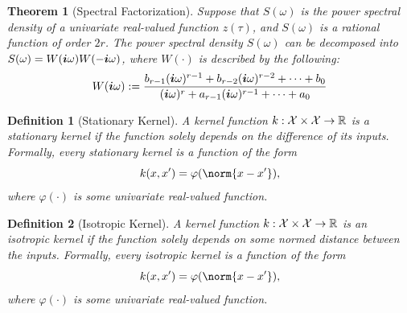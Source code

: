 \documentclass[10pt]{article}
\newtheorem{theorem}{Theorem}[section]
\newtheorem{definition}{Definition}[section]
\numberwithin{equation}{section}
\begin{document}
\begin{theorem}[Spectral Factorization]
\label{thm:spectral-factor}
    Suppose that $S(\omega)$ is the power spectral density of a univariate real-valued function $z(\tau)$, and $S(\omega)$ is a rational function of order $2r$. The power spectral density $S(\omega)$ can be decomposed into $S(\omega) = W(\bm{i}\omega)W(-\bm{i}\omega)$, where $W(\cdot)$ is described by the following:
    \begin{equation}
    \label{eq:spectral-factor}
        W(\bm{i}\omega) := \frac{b_{r-1}(\bm{i}\omega)^{r-1} + b_{r-2}(\bm{i}\omega)^{r-2} + \cdots + b_{0}}{(\bm{i}\omega)^{r} + a_{r-1}(\bm{i}\omega)^{r-1} + \cdots + a_{0}}
    \end{equation}
\end{theorem}

\begin{definition}[Stationary Kernel]
\label{def:stationary-kernel}
    A kernel function $k: \mathcal{X} \times \mathcal{X} \to \mathbb{R}$ is a stationary kernel if the function solely depends on the difference of its inputs. Formally, every stationary kernel is a function of the form
    \begin{equation}
        k(x, x') = \varphi(\norm{x - x'}),
    \end{equation}
    where $\varphi(\cdot)$ is some univariate real-valued function.
\end{definition}

\begin{definition}[Isotropic Kernel]
\label{def:isotropic-kernel}
    A kernel function $k: \mathcal{X} \times \mathcal{X} \to \mathbb{R}$ is an isotropic kernel if the function solely depends on some normed distance between the inputs. Formally, every isotropic kernel is a function of the form
    \begin{equation}
        k(x, x') = \varphi(\norm{x - x'}),
    \end{equation}
    where $\varphi(\cdot)$ is some univariate real-valued function.
\end{definition}
\end{document}
